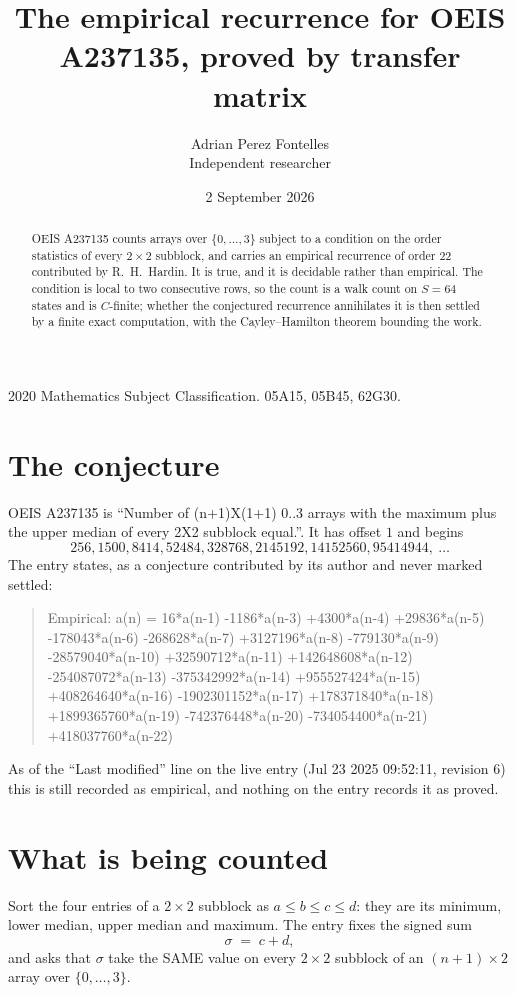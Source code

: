 \documentclass[11pt,a4paper]{article}
\title{The empirical recurrence for OEIS A237135, proved by transfer matrix}
\author{Adrian Perez Fontelles\\ \small Independent researcher}
\date{2 September 2026}
\theoremstyle{plain}
\theoremstyle{definition}
\begin{document}
\maketitle

\begin{abstract}
OEIS A237135 counts arrays over $\{0,\dots,3\}$ subject to a condition on the order
statistics of every $2\times2$ subblock, and carries an empirical recurrence of order
$22$ contributed by R.~H.~Hardin. It is true, and it is decidable rather than empirical.
The condition is local to two consecutive rows, so the count is a walk count on $S=64$
states and is $C$-finite; whether the conjectured recurrence annihilates it is then settled by
a finite exact computation, with the Cayley--Hamilton theorem bounding the work.
\end{abstract}

\noindent\small 2020 Mathematics Subject Classification. 05A15, 05B45, 62G30.\normalsize

\section{The conjecture}

OEIS A237135 is ``Number of (n+1)X(1+1) 0..3 arrays with the maximum plus the upper median of every 2X2 subblock equal.''. It has offset $1$ and begins
\[
256, 1500, 8414, 52484, 328768, 2145192, 14152560, 95414944,\ \dots
\]
The entry states, as a conjecture contributed by its author and never marked settled:
\begin{quote}
Empirical: a(n) = 16*a(n-1) -1186*a(n-3) +4300*a(n-4) +29836*a(n-5) -178043*a(n-6) -268628*a(n-7) +3127196*a(n-8) -779130*a(n-9) -28579040*a(n-10) +32590712*a(n-11) +142648608*a(n-12) -254087072*a(n-13) -375342992*a(n-14) +955527424*a(n-15) +408264640*a(n-16) -1902301152*a(n-17) +178371840*a(n-18) +1899365760*a(n-19) -742376448*a(n-20) -734054400*a(n-21) +418037760*a(n-22)
\end{quote}
As of the ``Last modified'' line on the live entry (Jul 23 2025 09:52:11, revision 6) this is still
recorded as empirical, and nothing on the entry records it as proved.

\section{What is being counted}

Sort the four entries of a $2\times2$ subblock as $a\le b\le c\le d$: they
are its minimum, lower median, upper median and maximum. The entry fixes the signed sum
\[
\sigma\;=\;c+d,
\]
and asks that $\sigma$ take the SAME value on every $2\times2$ subblock of an
$(n+1)\times2$ array over $\{0,\dots,3\}$.
\end{document}
